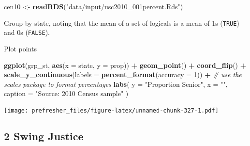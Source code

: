 \documentclass[]{book}
\newenvironment{Shaded}{\begin{snugshade}}{\end{snugshade}}
\newcommand{\KeywordTok}[1]{\textcolor[rgb]{0.13,0.29,0.53}{\textbf{#1}}}
\newcommand{\DataTypeTok}[1]{\textcolor[rgb]{0.13,0.29,0.53}{#1}}
\newcommand{\DecValTok}[1]{\textcolor[rgb]{0.00,0.00,0.81}{#1}}
\newcommand{\StringTok}[1]{\textcolor[rgb]{0.31,0.60,0.02}{#1}}
\newcommand{\CommentTok}[1]{\textcolor[rgb]{0.56,0.35,0.01}{\textit{#1}}}
\newcommand{\OperatorTok}[1]{\textcolor[rgb]{0.81,0.36,0.00}{\textbf{#1}}}
\newcommand{\NormalTok}[1]{#1}
\theoremstyle{definition}
\theoremstyle{definition}
\theoremstyle{definition}
\theoremstyle{remark}
\begin{document}
\begin{Shaded}
\begin{Highlighting}[]
\NormalTok{cen10 <-}\StringTok{ }\KeywordTok{readRDS}\NormalTok{(}\StringTok{"data/input/usc2010_001percent.Rds"}\NormalTok{)}
\end{Highlighting}
\end{Shaded}

Group by state, noting that the mean of a set of logicals is a mean of
1s (\texttt{TRUE}) and 0s (\texttt{FALSE}).

\begin{Shaded}
\end{Shaded}

Plot points

\begin{Shaded}
\begin{Highlighting}[]
\KeywordTok{ggplot}\NormalTok{(grp_st, }\KeywordTok{aes}\NormalTok{(}\DataTypeTok{x =}\NormalTok{ state, }\DataTypeTok{y =}\NormalTok{ prop)) }\OperatorTok{+}
\StringTok{  }\KeywordTok{geom_point}\NormalTok{() }\OperatorTok{+}
\StringTok{  }\KeywordTok{coord_flip}\NormalTok{() }\OperatorTok{+}
\StringTok{  }\KeywordTok{scale_y_continuous}\NormalTok{(}\DataTypeTok{labels =} \KeywordTok{percent_format}\NormalTok{(}\DataTypeTok{accuracy =} \DecValTok{1}\NormalTok{)) }\OperatorTok{+}\StringTok{ }\CommentTok{# use the scales package to format percentages}
\StringTok{  }\KeywordTok{labs}\NormalTok{(}
    \DataTypeTok{y =} \StringTok{"Proportion Senior"}\NormalTok{,}
    \DataTypeTok{x =} \StringTok{""}\NormalTok{,}
    \DataTypeTok{caption =} \StringTok{"Source: 2010 Census sample"}
\NormalTok{  )}
\end{Highlighting}
\end{Shaded}

\texttt{[image: prefresher\_files/figure-latex/unnamed-chunk-327-1.pdf]}

\subsection*{2 Swing Justice}\label{swing-justice}
\end{document}
